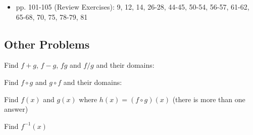 \documentclass[fleqn,addpoints]{exam}
\begin{document}
\begin{itemize}
  \item pp. 101-105 (Review Exercises): 9, 12, 14, 26-28, 44-45, 50-54, 56-57, 61-62, 65-68, 70, 75, 78-79, 81
\end{itemize}

\subsection{Other Problems}

\begin{questions}
\question
Find $f+g$, $f-g$, $fg$ and $f/g$ and their domains:

\question
Find $f \circ g$ and $g \circ f$ and their domains:

\question
Find $f(x)$ and $g(x)$ where $h(x) = (f \circ g)(x)$ (there is more than one answer)

\question

Find $f^{-1}(x)$

\end{questions}
\end{document}
